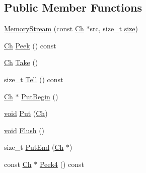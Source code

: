\subsection*{Public Member Functions}
\begin{DoxyCompactItemize}
\item 
\hyperlink{structMemoryStream_a2472317ef00fcd44e5cc209e04c49756}{Memory\+Stream} (const \hyperlink{structMemoryStream_a62a1cbd052c325c83dbdb387d2f89088}{Ch} $\ast$src, size\+\_\+t \hyperlink{imgui__impl__opengl3__loader_8h_a3d1e3edfcf61ca2d831883e1afbad89e}{size})
\item 
\hyperlink{structMemoryStream_a62a1cbd052c325c83dbdb387d2f89088}{Ch} \hyperlink{structMemoryStream_a707014bbfd303838b6a7b90be24f6adc}{Peek} () const
\item 
\hyperlink{structMemoryStream_a62a1cbd052c325c83dbdb387d2f89088}{Ch} \hyperlink{structMemoryStream_a14ff92deda5d39c9b166aaa07e82a0ee}{Take} ()
\item 
size\+\_\+t \hyperlink{structMemoryStream_a2de1486742f0d44decda90a56bc43268}{Tell} () const
\item 
\hyperlink{structMemoryStream_a62a1cbd052c325c83dbdb387d2f89088}{Ch} $\ast$ \hyperlink{structMemoryStream_a5674d10aa2faa05cb326e2e16715cc3d}{Put\+Begin} ()
\item 
\hyperlink{imgui__impl__opengl3__loader_8h_ac668e7cffd9e2e9cfee428b9b2f34fa7}{void} \hyperlink{structMemoryStream_ac445f93c23c9e85f1f5381911c4ed870}{Put} (\hyperlink{structMemoryStream_a62a1cbd052c325c83dbdb387d2f89088}{Ch})
\item 
\hyperlink{imgui__impl__opengl3__loader_8h_ac668e7cffd9e2e9cfee428b9b2f34fa7}{void} \hyperlink{structMemoryStream_a305e141314ae0e3afacb04aaf2d8bcc6}{Flush} ()
\item 
size\+\_\+t \hyperlink{structMemoryStream_a74fb36c1f6f95d189502cf7a6be79135}{Put\+End} (\hyperlink{structMemoryStream_a62a1cbd052c325c83dbdb387d2f89088}{Ch} $\ast$)
\item 
const \hyperlink{structMemoryStream_a62a1cbd052c325c83dbdb387d2f89088}{Ch} $\ast$ \hyperlink{structMemoryStream_ac63422050829d9724086363247059089}{Peek4} () const
\end{DoxyCompactItemize}
